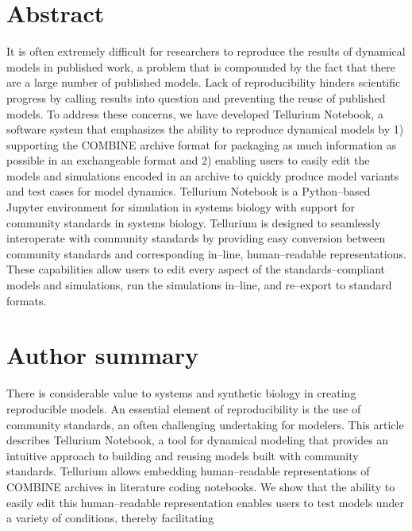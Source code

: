 \documentclass[10pt,letterpaper]{article}
\begin{document}
\section*{Abstract}
It is often extremely difficult for researchers to reproduce the results of dynamical models in published work, a problem that is compounded by the fact that there are a large number of published models. Lack of reproducibility hinders scientific progress by calling results into question and preventing the reuse of published models. To address these concerns, we have developed Tellurium Notebook, a software system that emphasizes the ability to reproduce dynamical models by 1) supporting the COMBINE archive format for packaging as much information as possible in an exchangeable format and 2) enabling users to easily edit the models and simulations encoded in an archive to quickly produce model variants and test cases for model dynamics. Tellurium Notebook is a Python--based Jupyter environment for simulation in systems biology with support for community standards in systems biology. Tellurium is designed to seamlessly interoperate with community standards by providing easy conversion between community standards and corresponding in--line, human--readable representations. These capabilities allow users to edit every aspect of the standards--compliant models and simulations, run the simulations in--line, and re--export to standard formats.

\section*{Author summary}
There is considerable value to systems and synthetic biology  in creating reproducible models. An essential element of reproducibility  is the use of community standards, an often challenging undertaking for modelers. This article describes Tellurium Notebook, a tool for dynamical modeling that provides an intuitive approach to building and reusing models built with community standards. Tellurium allows embedding human--readable representations of COMBINE archives in literature coding notebooks. We show that the ability to easily edit this human--readable representation enables users to test models under a variety of conditions, thereby facilitating
%
%
\end{document}

